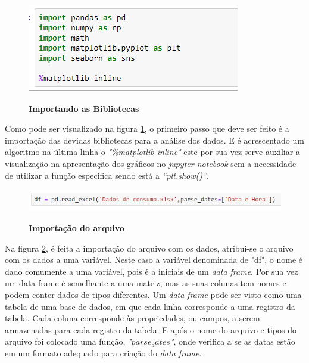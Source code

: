\begin{figure}[ht]
	\caption{\textbf{Importando as Bibliotecas}}
	\centering
		\includegraphics[scale=1, keepaspectratio]{figuras/importacaodasbibliotecas.PNG}
		\label{impor_b}
\end{figure}

\par Como pode ser visualizado na figura \ref{impor_b}, o primeiro passo que deve ser feito é a importação das devidas bibliotecas para a análise dos dados. E é acrescentado um algoritmo na última linha o \emph{"\%matplotlib inline"} este por sua vez serve auxiliar a visualização na apresentação dos gráficos no \emph{jupyter notebook} sem a necessidade de utilizar a função especifica sendo está a \emph{“plt.show()”}.


\begin{figure}[ht]
	\caption{\textbf{Importação do arquivo}}
	\centering
		\includegraphics[scale=1, keepaspectratio]{figuras/importaroarquivo}
		\label{impor_arquivo}
\end{figure}


\par Na figura \ref{impor_arquivo},  é   feita  a  importação do arquivo com os dados, atribui-se o arquivo com os dados a uma variável. Neste caso a variável denominada de "df", o  nome é dado comumente a uma variável, pois é a iniciais de um \emph{data frame}. Por sua vez um data frame é semelhante a uma matriz, mas as suas colunas tem nomes e podem conter dados de tipos diferentes. Um \emph{data frame} pode ser visto como uma tabela de uma base de dados, em que cada linha corresponde a uma registro da tabela. Cada coluna corresponde às propriedades, ou campos, a serem armazenadas para cada registro da tabela.  E   após  o  nome do arquivo  e  tipos do arquivo foi colocado uma função, \emph{"$parse_dates$"}, onde verifica a se as datas estão em um formato adequado para criação do \emph{data frame}.

